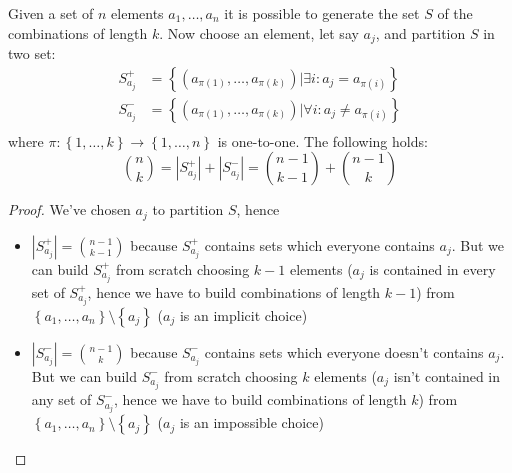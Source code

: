 Given a set of $n$ elements $a_1, \ldots,a_n$ it is possible to
generate the set $S$ of the combinations of length $k$. Now choose an
element, let say $a_j$, and partition $S$ in two set:
\begin{displaymath}
  \begin{split}
    S_{a_j}^+ &= \left \lbrace (a_{\pi(1)}, \ldots, a_{\pi(k)}) |
      \exists i: a_j = a_{\pi(i)} \right\rbrace \\
    S_{a_j}^- &= \left \lbrace (a_{\pi(1)}, \ldots, a_{\pi(k)}) |
      \forall i: a_j \not = a_{\pi(i)} \right\rbrace \\    
  \end{split}
\end{displaymath}
where $\pi: \left \lbrace 1, \ldots, k \right\rbrace \rightarrow \left
  \lbrace 1, \ldots, n \right\rbrace $ is one-to-one. The following
holds:
\begin{displaymath}
  {{n}\choose{k}} = \left| S_{a_j}^+ \right| + \left| S_{a_j}^-
  \right| = {{n-1}\choose{k-1}} +  {{n-1}\choose{k}}
\end{displaymath}
\begin{proof}
  We've chosen $a_j$ to partition $S$, hence
  \begin{itemize}
  \item $\left| S_{a_j}^+ \right| = {{n-1}\choose{k-1}}$ because
    $S_{a_j}^+$ contains sets which everyone contains $a_j$. But we
    can build $ S_{a_j}^+$ from scratch choosing $k-1$ elements ($a_j$
    is contained in every set of $S_{a_j}^+$, hence we have to build
    combinations of length $k-1$) from $\left \lbrace a_1, \ldots, a_n
    \right\rbrace \setminus \left \lbrace a_j \right\rbrace $ ($a_j$
    is an implicit choice)
  \item $\left| S_{a_j}^- \right| = {{n-1}\choose{k}}$ because $
    S_{a_j}^-$ contains sets which everyone doesn't contains
    $a_j$. But we can build $ S_{a_j}^- $ from scratch choosing $k$
    elements ($a_j$ isn't contained in any set of $S_{a_j}^-$, hence
    we have to build combinations of length $k$) from $\left \lbrace
      a_1, \ldots, a_n \right\rbrace \setminus \left \lbrace a_j
    \right\rbrace $ ($a_j$ is an impossible choice)
  \end{itemize}
\end{proof}

